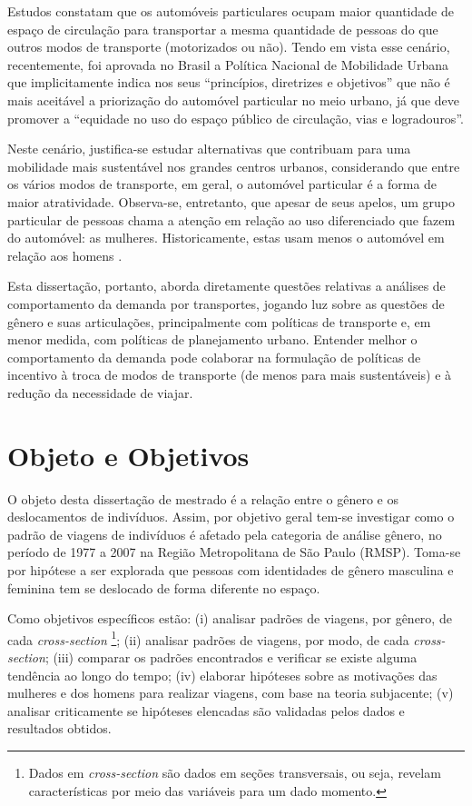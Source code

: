 Estudos constatam \cite{VASCONCELLOS2001,RUEDA2007} que os automóveis particulares ocupam maior quantidade de espaço de circulação para transportar a mesma quantidade de pessoas do que outros modos de transporte (motorizados ou não).  
Tendo em vista esse cenário, recentemente, foi aprovada no Brasil a Política Nacional de Mobilidade Urbana \cite{PNMU} que implicitamente indica nos seus ``princípios, diretrizes e objetivos'' que não é mais aceitável a priorização do automóvel particular no meio urbano, já que deve promover a ``equidade no uso do espaço público de circulação, vias e logradouros''.

Neste cenário, justifica-se estudar alternativas que contribuam para uma mobilidade mais sustentável nos grandes centros urbanos, considerando que entre os vários modos de transporte, em geral, o automóvel particular é a forma de maior atratividade. Observa-se, entretanto, que apesar de seus apelos, um grupo particular de pessoas chama a atenção em relação ao uso diferenciado que fazem do automóvel: as mulheres.
Historicamente, estas usam menos o automóvel em relação aos homens \cite{FOX1983,HJORTHOL2000,POLK2003,BEST2005}.

Esta dissertação, portanto, aborda diretamente questões relativas a análises de comportamento da demanda por transportes, jogando luz sobre as questões de  gênero e suas articulações, principalmente com políticas de transporte e, em menor medida, com políticas de planejamento urbano. Entender melhor o comportamento da demanda pode colaborar na formulação de políticas de incentivo à troca de modos de transporte (de menos para mais sustentáveis) e à redução da necessidade de viajar.

\section{Objeto e Objetivos}
O objeto desta dissertação de mestrado é a relação entre o gênero e os deslocamentos de indivíduos. Assim, por objetivo geral tem-se investigar como o padrão de viagens de indivíduos é afetado pela categoria de análise gênero, no período de 1977 a 2007 na Região Metropolitana de São Paulo (RMSP). Toma-se por hipótese a ser explorada que pessoas com identidades de gênero masculina e feminina tem se deslocado de forma diferente no espaço.

Como objetivos específicos estão:
(i) analisar padrões de viagens, por gênero, de cada \emph{cross-section}
\footnote{Dados em \emph{cross-section} são dados em seções transversais, ou seja, revelam características por meio das variáveis para um dado momento.};
(ii) analisar padrões de viagens, por modo, de cada \emph{cross-section};
(iii) comparar os padrões encontrados e verificar se existe alguma tendência ao longo do tempo; (iv) elaborar hipóteses sobre as motivações das mulheres e dos homens para realizar viagens, com base na teoria subjacente; (v) analisar criticamente se hipóteses elencadas são validadas pelos dados e resultados obtidos.




